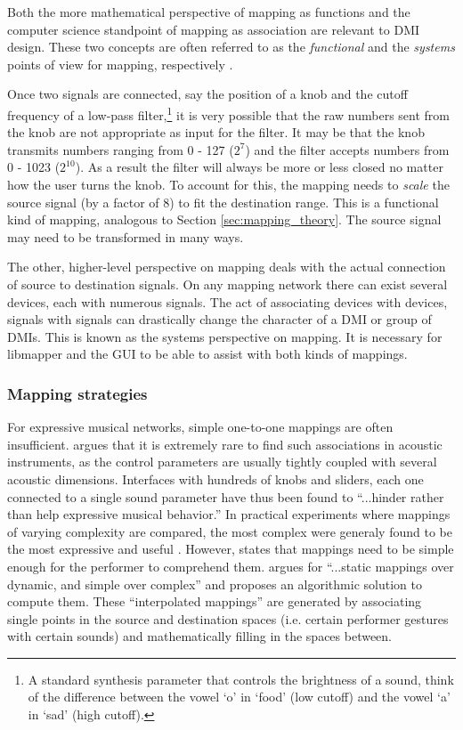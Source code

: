 Both the more mathematical perspective of mapping as functions and the computer science standpoint of mapping as association are relevant to DMI design. These two concepts are often referred to as the \emph{functional} and the \emph{systems} points of view for mapping, respectively \cite{two_types_of_mapping}. 

Once two signals are connected, say the position of a knob and the cutoff frequency of a low-pass filter,\footnote{A standard synthesis parameter that controls the brightness of a sound, think of the difference between the vowel `o' in `food' (low cutoff) and the vowel `a' in `sad' (high cutoff).} it is very possible that the raw numbers sent from the knob are not appropriate as input for the filter. It may be that the knob transmits numbers ranging from 0 - 127 ($2^7$) and the filter accepts numbers from 0 - 1023 ($2^{10}$). As a result the filter will always be more or less closed no matter how the user turns the knob. To account for this, the mapping needs to \emph{scale} the source signal (by a factor of 8) to fit the destination range. This is a functional kind of mapping, analogous to Section \ref{sec:mapping_theory}. The source signal may need to be transformed in many ways. 

The other, higher-level perspective on mapping deals with the actual connection of source to destination signals. On any mapping network there can exist several devices, each with numerous signals. The act of associating devices with devices, signals with signals can drastically change the character of a DMI or group of DMIs. This is known as the systems perspective on mapping. It is necessary for libmapper and the GUI to be able to assist with both kinds of mappings.

	\subsubsection{Mapping strategies}

For expressive musical networks, simple one-to-one mappings are often insufficient.  argues that it is extremely rare to find such associations in acoustic instruments, as the control parameters are usually tightly coupled with several acoustic dimensions. Interfaces with hundreds of knobs and sliders, each one connected to a single sound parameter have thus been found to ``...hinder rather than help expressive musical behavior.''  In practical experiments where mappings of varying complexity are compared, the most complex were generaly found to be the most expressive and useful \cite{mapping_complexity_experiments}. However,  states that mappings need to be simple enough for the performer to comprehend them.  argues for ``...static mappings over dynamic, and simple over complex'' and proposes an algorithmic solution to compute them. These ``interpolated mappings'' are generated by associating single points in the source and destination spaces (i.e. certain performer gestures with certain sounds) and mathematically filling in the spaces between.

